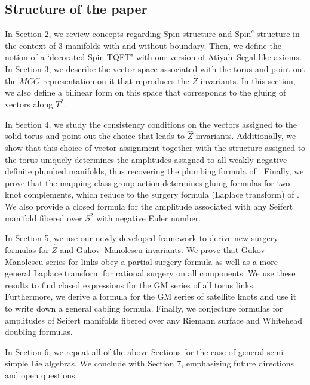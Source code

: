 \documentclass{article}
\numberwithin{corollary}{theorem}
\numberwithin{corollary}{proposition}
\begin{document}
\subsection*{Structure of the paper}
In Section 2, we review concepts regarding $\mathrm{Spin}$-structure and $\mathrm{Spin}^c$-structure in the context of 3-manifolds with and without boundary. Then, we define the notion of a `decorated $\mathrm{Spin}$ TQFT' with our version of Atiyah--Segal-like axioms. In Section 3, we describe the vector space associated with the torus and point out the $MCG$ representation on it that reproduces the $\hat{Z}$ invariants. In this section, we also define a bilinear form on this space that corresponds to the gluing of vectors along $T^2$.

In Section 4, we study the consistency conditions on the vectors assigned to the solid torus and point out the choice that leads to $\hat{Z}$ invariants. Additionally, we show that this choice of vector assignment together with the structure assigned to the torus uniquely determines the amplitudes assigned to all weakly negative definite plumbed manifolds, thus recovering the plumbing formula of \cite{GPPV}. Finally, we prove that the mapping class group action determines gluing formulas for two knot complements, which reduce to the surgery formula (Laplace transform) of \cite{GM}. We also provide a closed formula for the amplitude associated with any Seifert manifold fibered over $S^2$ with negative Euler number.

In Section 5, we use our newly developed framework to derive new surgery formulas for $\hat{Z}$ and Gukov--Manolescu invariants. We prove that Gukov--Manolescu series for links obey a partial surgery formula as well as a more general Laplace transform for rational surgery on all components. We use these results to find closed expressions for the GM series of all torus links. Furthermore, we derive a formula for the GM series of satellite knots and use it to write down a general cabling formula. Finally, we conjecture formulas for amplitudes of Seifert manifolds fibered over any Riemann surface and Whitehead doubling formulas.  

In Section 6, we repeat all of the above Sections for the case of general semi-simple Lie algebras. We conclude with Section 7, emphasizing future directions and open questions. 



\end{document}
